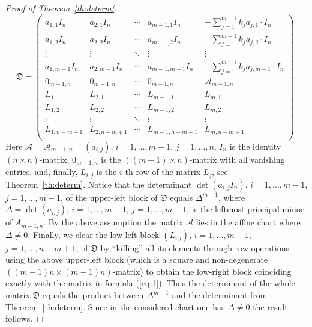 \documentclass[10pt,twoside,a4paper,reqno]{amsart}
\theoremstyle{plain}
\theoremstyle{definition}
\theoremstyle{remark}
\begin{document}
\begin{proof}[Proof of Theorem~\ref{th:determ}]
$$\mathfrak D=\begin{pmatrix}
a_{1,1}I_n& a_{2,1}I_n& \cdots&a_{m-1,1}I_n&  -\sum_{j=1}^{m-1}k_ja_{j,1}\cdot I_n\\
a_{1,2}I_n& a_{2,2}I_n& \cdots&a_{m-1,2}I_n&   -\sum_{j=1}^{m-1}k_ja_{j,2}\cdot I_n\\
\vdots        & \vdots        & \ddots & \vdots         &  \vdots   \\
a_{1,m-1}I_n& a_{2,m-1}I_n& \cdots&a_{m-1,m-1}I_n&   -\sum_{j=1}^{m-1}k_ja_{j,m-1}\cdot I_n\\
0_{m-1,n}&0_{m-1,n}&\cdots &0_{m-1,n}& {\mathcal A}_{m-1,n}\\
L_{1,1}    &L_{2,1}    & \cdots & L_{m-1,1} & L_{m,1}\\
L_{1,2}    &L_{2,2}    & \cdots & L_{m-1,2} & L_{m,2}\\
\vdots        & \vdots        & \ddots & \vdots         &  \vdots   \\
L_{1,n-m+1}    &L_{2,n-m+1}    & \cdots & L_{m-1,n-m+1} & L_{m,n-m+1}\\
\end{pmatrix}.
$$
Here ${\mathcal A}={\mathcal A}_{m-1,n}=(a_{i,j})$, $i=1,\ldots,m-1$, $j=1,\ldots,n$,  $I_n$ is the identity $(n\times n)$-matrix, $0_{m-1,n}$ is the $((m-1) \times n)$-matrix with all vanishing entries, and, finally, $L_{i,j}$ is the $i$-th row of the matrix $L_j$, see Theorem~\ref{th:determ}.  Notice that the determinant $\det(a_{i,j}I_n)$, $i=1,\ldots,m-1$, $j=1,\ldots,m-1$,  of the upper-left block of $\mathfrak D$ equals $\Delta^{m-1}$, where $\Delta=\det (a_{i,j})$, $i=1,\ldots,m-1$, $j=1,\ldots,m-1$, is the leftmost principal minor of $A_{m-1,n}$.   By the above assumption the matrix ${\mathcal A}$ lies in the affine chart where $\Delta\neq 0$.  Finally,  we clear the low-left block $(L_{i.j})$, $i=1,\ldots,m-1$, $j=1,\ldots,n-m+1$, of $\mathfrak D$ by ``killing'' all its elements  through row operations using the above upper-left block (which is a square and non-degenerate $((m-1)n\times (m-1)n)$-matrix) to obtain the low-right  block coinciding exactly  with the matrix in formula (\ref{eq:1}). Thus the determinant of the whole matrix $\mathfrak D$ equals the product between $\Delta^{m-1}$ and the determinant from Theorem~\ref{th:determ}. Since in the considered chart one has $\Delta\neq 0$ the result follows. 
\end{proof}
\end{document}
